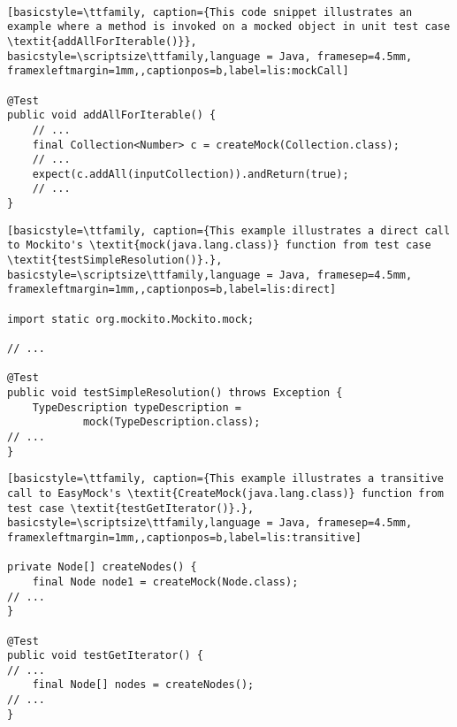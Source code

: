 ‎

\begin{lstlisting}[basicstyle=\ttfamily, caption={This code snippet illustrates an example where a method is invoked on a mocked object in unit test case \textit{addAllForIterable()}},
basicstyle=\scriptsize\ttfamily,language = Java, framesep=4.5mm,
framexleftmargin=1mm,,captionpos=b,label=lis:mockCall]

@Test
public void addAllForIterable() {
	// ...
	final Collection<Number> c = createMock(Collection.class);
	// ...
	expect(c.addAll(inputCollection)).andReturn(true);
	// ...
}

\end{lstlisting}

\begin{lstlisting}[basicstyle=\ttfamily, caption={This example illustrates a direct call to Mockito's \textit{mock(java.lang.class)} function from test case \textit{testSimpleResolution()}.},
basicstyle=\scriptsize\ttfamily,language = Java, framesep=4.5mm,
framexleftmargin=1mm,,captionpos=b,label=lis:direct]

import static org.mockito.Mockito.mock;

// ...

@Test
public void testSimpleResolution() throws Exception {
	TypeDescription typeDescription = 
			mock(TypeDescription.class);
// ...
}

\end{lstlisting}

\begin{lstlisting}[basicstyle=\ttfamily, caption={This example illustrates a transitive call to EasyMock's \textit{CreateMock(java.lang.class)} function from test case \textit{testGetIterator()}.},
basicstyle=\scriptsize\ttfamily,language = Java, framesep=4.5mm,
framexleftmargin=1mm,,captionpos=b,label=lis:transitive]

private Node[] createNodes() {
	final Node node1 = createMock(Node.class);
// ...
}

@Test
public void testGetIterator() {
// ...
	final Node[] nodes = createNodes();
// ...
}

\end{lstlisting}
